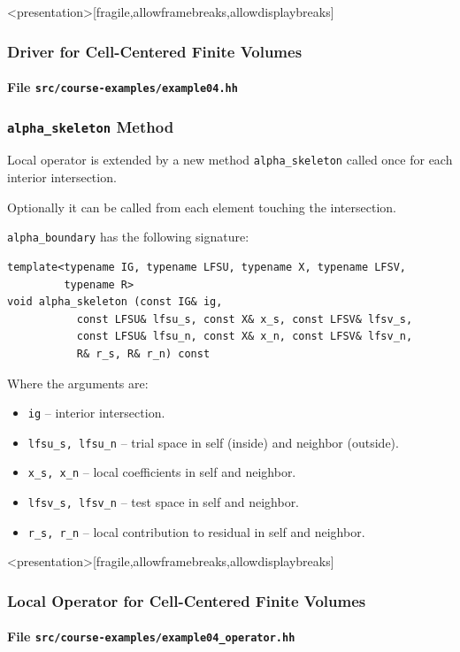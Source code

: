 \begin{frame}<presentation>[fragile,allowframebreaks,allowdisplaybreaks]
\frametitle<presentation>{Driver for Cell-Centered Finite Volumes}
\framesubtitle<presentation>{File \texttt{src/course-examples/example04.hh}}

\end{frame}

\begin{frame}[fragile]
\frametitle{\lstinline{alpha_skeleton} Method}
Local operator is extended by a new method \lstinline{alpha_skeleton}
called once for each interior intersection.

Optionally it can be called from each element touching the intersection.

\lstinline{alpha_boundary} has the following signature: 
\begin{lstlisting}[basicstyle=\scriptsize]
template<typename IG, typename LFSU, typename X, typename LFSV, 
         typename R>
void alpha_skeleton (const IG& ig, 
           const LFSU& lfsu_s, const X& x_s, const LFSV& lfsv_s,
           const LFSU& lfsu_n, const X& x_n, const LFSV& lfsv_n, 
           R& r_s, R& r_n) const
\end{lstlisting}
Where the arguments are:
\begin{itemize}
\item \lstinline{ig} -- interior intersection.
\item \lstinline{lfsu_s, lfsu_n} -- trial space in self (inside) and neighbor (outside).
\item \lstinline{x_s, x_n} -- local coefficients in self and neighbor.
\item \lstinline{lfsv_s, lfsv_n} -- test space in self and neighbor. 
\item \lstinline{r_s, r_n} -- local contribution to residual in self and neighbor.
\end{itemize}
\end{frame}

\begin{frame}<presentation>[fragile,allowframebreaks,allowdisplaybreaks]
\frametitle<presentation>{Local Operator for Cell-Centered Finite Volumes}
\framesubtitle<presentation>{File \texttt{src/course-examples/example04\_operator.hh}}

\end{frame}


